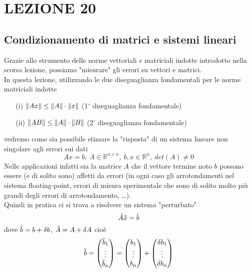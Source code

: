 \documentclass[12pt,a4paper]{article}
\DeclarePairedDelimiter{\norma}{\lVert}{\rVert}
\begin{document}
\section*{LEZIONE 20}
\subsection*{Condizionamento di matrici e sistemi lineari}

Grazie allo strumento delle norme vettoriali e matriciali indotte introdotto nella scorsa lezione, possiamo "misurare" gli errori su vettori e matrici.\\
In questa lezione, utilizzando le due diseguaglianza fondamentali per le norme matriciali indotte
\begin{itemize}
    \item[(i)]$\norma{Ax} \leq \norma{A}\cdot\norma{x}$ (1$^\circ$ diseguaglianza fondamentale)
    \item[(ii)] $\norma{AB} \leq \norma{A} \cdot\norma{B}$ (2$^\circ$ diseguaglianza fondamentale)
\end{itemize}
vedremo come sia possibile stimare la "risposta" di un sistema lineare non singolare agli errori sui dati
\begin{equation*}
    Ax=b, \ A\in \mathbb{R}^{n\times n}, \ b,x\in \mathbb{R}^n, \ det(A) \neq 0
\end{equation*}
Nelle applicazioni infatti sia la matrice $A$ che il vettore termine noto $b$ possono essere (e di solito sono) affetti da errori (in ogni caso gli arrotondamenti nel sistema floating-point, errori di misura sperimentale che sono di solito molto più grandi degli errori di arrotondamento, \dots).\\
Quindi in pratica ci si trova a risolvere un sistema "perturbato"
\begin{equation*}
    \Tilde{A}\Tilde{x}=\Tilde{b}
\end{equation*}
dove $\Tilde{b}=b+\delta b$, $\Tilde{A}=A+\delta A$ cioè
\begin{equation*}
    \Tilde{b}= 
    \begin{pmatrix}
    \Tilde{b}_1\\  
    \vdots\\ 
    \Tilde{b}_n
\end{pmatrix} =
\begin{pmatrix}
    b_1\\  
    \vdots\\ 
    b_n
\end{pmatrix} + 
\begin{pmatrix}
    \delta b_1\\  
    \vdots\\ 
    \delta b_n
\end{pmatrix}
\end{equation*}
\end{document}
